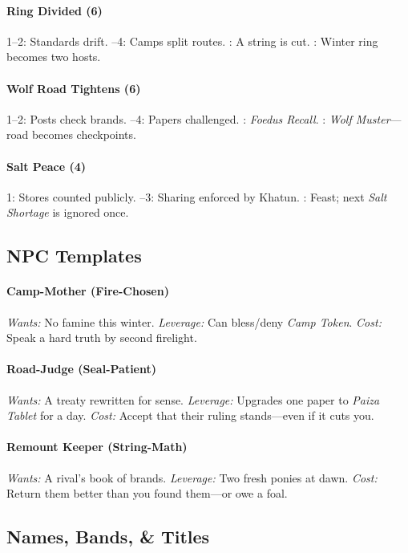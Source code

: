 \paragraph{Ring Divided (6)}
1–2: Standards drift. –4: Camps split routes. : A string is cut. : Winter ring becomes two hosts.

\paragraph{Wolf Road Tightens (6)}
1–2: Posts check brands. –4: Papers challenged. : \emph{Foedus Recall}. : \emph{Wolf Muster}—road becomes checkpoints.

\paragraph{Salt Peace (4)}
1: Stores counted publicly. –3: Sharing enforced by Khatun. : Feast; next \emph{Salt Shortage} is ignored once.
\subsection*{NPC Templates}

\paragraph{Camp-Mother (Fire-Chosen)}
\emph{Wants:} No famine this winter.  
\emph{Leverage:} Can bless/deny \emph{Camp Token}.  
\emph{Cost:} Speak a hard truth by second firelight.

\paragraph{Road-Judge (Seal-Patient)}
\emph{Wants:} A treaty rewritten for sense.  
\emph{Leverage:} Upgrades one paper to \emph{Paiza Tablet} for a day.  
\emph{Cost:} Accept that their ruling stands—even if it cuts you.

\paragraph{Remount Keeper (String-Math)}
\emph{Wants:} A rival’s book of brands.  
\emph{Leverage:} Two fresh ponies at dawn.  
\emph{Cost:} Return them better than you found them—or owe a foal.
\subsection*{Names, Bands, \& Titles}

